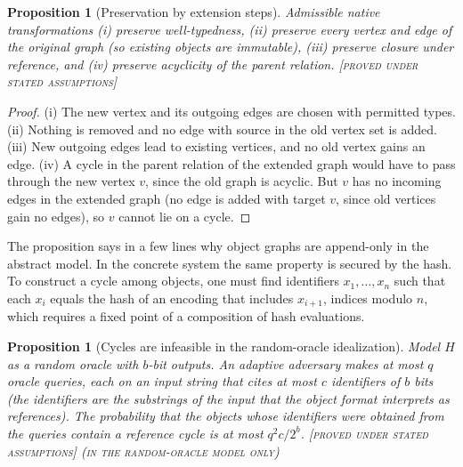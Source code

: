 \documentclass[11pt,twoside,openright]{book}
\theoremstyle{plain}
\newtheorem{proposition}[theorem]{Proposition}
\theoremstyle{definition}
\theoremstyle{remark}
\newcommand{\Proved}{\textup{\textsc{[proved under stated assumptions]}}}
\begin{document}
\begin{proposition}[Preservation by extension steps]\label{prop:extpreserve}
Admissible native transformations (i) preserve well-typedness, (ii) preserve every vertex and edge of the original graph (so existing objects are immutable), (iii) preserve closure under reference, and (iv) preserve acyclicity of the parent relation.
\Proved{}
\end{proposition}

\begin{proof}
(i) The new vertex and its outgoing edges are chosen with permitted types. (ii) Nothing is removed and no edge with source in the old vertex set is added. (iii) New outgoing edges lead to existing vertices, and no old vertex gains an edge. (iv) A cycle in the parent relation of the extended graph would have to pass through the new vertex $v$, since the old graph is acyclic. But $v$ has no incoming edges in the extended graph (no edge is added with target $v$, since old vertices gain no edges), so $v$ cannot lie on a cycle.
\end{proof}

The proposition says in a few lines why object graphs are append-only in the abstract model. In the concrete system the same property is secured by the hash. To construct a cycle among objects, one must find identifiers $x_1,\dots,x_n$ such that each $x_i$ equals the hash of an encoding that includes $x_{i+1}$, indices modulo $n$, which requires a fixed point of a composition of hash evaluations.

\begin{proposition}[Cycles are infeasible in the random-oracle idealization]\label{prop:nocycle}
Model $H$ as a random oracle with $b$-bit outputs. An adaptive adversary makes at most $q$ oracle queries, each on an input string that cites at most $c$ identifiers of $b$ bits (the identifiers are the substrings of the input that the object format interprets as references). The probability that the objects whose identifiers were obtained from the queries contain a reference cycle is at most $q^2c/2^b$.
\Proved{} \textsc{(in the random-oracle model only)}
\end{proposition}
\end{document}
